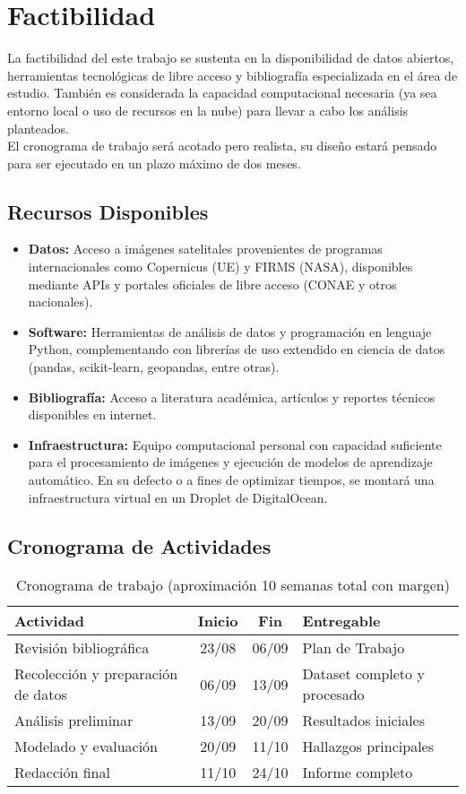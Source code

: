 \section{Factibilidad}
La factibilidad del este trabajo se sustenta en la disponibilidad de datos abiertos, herramientas tecnológicas de libre acceso y bibliografía especializada en el área de estudio. También es considerada la capacidad computacional necesaria (ya sea entorno local o uso de recursos en la nube) para llevar a cabo los análisis planteados. \\

El cronograma de trabajo será acotado pero realista, su diseño estará pensado para ser ejecutado en un plazo máximo de dos meses.

\subsection{Recursos Disponibles}
\begin{itemize}
    \item \textbf{Datos:} Acceso a imágenes satelitales provenientes de programas internacionales como Copernicus (UE) y FIRMS (NASA), disponibles mediante APIs y portales oficiales de libre acceso (CONAE y otros nacionales).
    \item \textbf{Software:} Herramientas de análisis de datos y programación en lenguaje Python, complementando con librerías de uso extendido en ciencia de datos (pandas, scikit-learn, geopandas, entre otras).
    \item \textbf{Bibliografía:} Acceso a literatura académica, artículos y reportes técnicos disponibles en internet.
    \item \textbf{Infraestructura:} Equipo computacional personal con capacidad suficiente para el procesamiento de imágenes y ejecución de modelos de aprendizaje automático. En su defecto o a fines de optimizar tiempos, se montará una infraestructura virtual en un Droplet de DigitalOcean.
\end{itemize}

\subsection{Cronograma de Actividades}
\begin{table}[h]
\centering
\begin{tabular}{lccl}
\toprule
\textbf{Actividad} & \textbf{Inicio} & \textbf{Fin} & \textbf{Entregable} \\
\midrule
Revisión bibliográfica & 23/08 & 06/09 & Plan de Trabajo \\
Recolección y preparación de datos & 06/09 & 13/09 & Dataset completo y procesado \\
Análisis preliminar & 13/09 & 20/09 & Resultados iniciales \\
Modelado y evaluación & 20/09 & 11/10 & Hallazgos principales \\
Redacción final & 11/10 & 24/10 & Informe completo \\
\bottomrule
\end{tabular}
\caption{Cronograma de trabajo (aproximación 10 semanas total con margen)}
\end{table}


